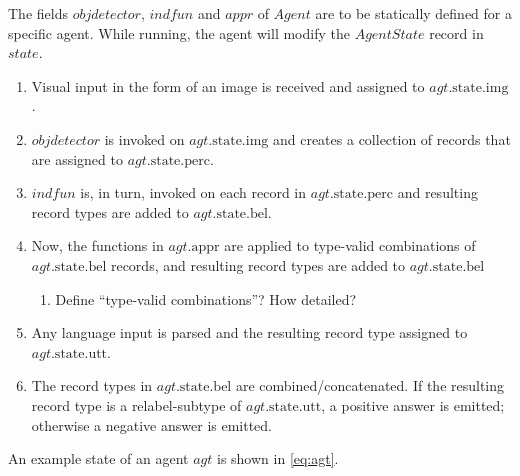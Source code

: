 The fields $objdetector$, $indfun$ and $appr$ of $Agent$ are to be statically defined for a specific agent.
While running, the agent will modify the $AgentState$ record in $state$.

\begin{enumerate}
\item Visual input in the form of an image is received and assigned to $agt.\text{state}.\text{img}$.
\item $objdetector$ is invoked on $agt.\text{state.img}$ and creates a collection of records that are assigned to $agt.\text{state}.\text{perc}$.
\item $indfun$ is, in turn, invoked on each record in $agt.\text{state.perc}$ and resulting record types are added to $agt.\text{state.bel}$.
\item Now, the functions in $agt.\text{appr}$ are applied to type-valid combinations of $agt.\text{state.bel}$ records, and resulting record types are added to $agt.\text{state.bel}$
	\begin{enumerate}
	\item Define ``type-valid combinations''? How detailed?
	\end{enumerate}
\item Any language input is parsed and the resulting record type assigned to $agt.\text{state.utt}$.
\item The record types in $agt.\text{state.bel}$ are combined/concatenated. If the resulting record type is a relabel-subtype of $agt.\text{state.utt}$, a positive answer is emitted; otherwise a negative answer is emitted.
\end{enumerate}

An example state of an agent $agt$ is shown in \autoref{eq:agt}.

